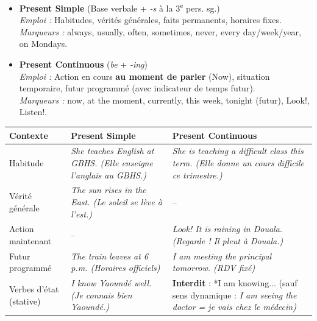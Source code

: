 \documentclass[11pt]{article}
\newcommand{\cle}[1]{{\popxbold\color{popdark}#1}}
\newcommand{\eng}[1]{\ifmmode\text{\textit{#1}}\else\begingroup\selectlanguage{english}\itshape #1\endgroup\fi}
\begin{document}
\begin{propriete}
\begin{itemize}
    \item \textbf{Present Simple} (Base verbale + \textit{-s} à la 3\textsuperscript{e} pers. sg.) \\
    \emph{Emploi :} Habitudes, vérités générales, faits permanents, horaires fixes. \\
    \emph{Marqueurs :} \cle{always}, \cle{usually}, \cle{often}, \cle{sometimes}, \cle{never}, \cle{every day/week/year}, \cle{on Mondays}.
    \item \textbf{Present Continuous} (\textit{be} + \textit{-ing}) \\
    \emph{Emploi :} Action en cours \textbf{au moment de parler} (Now), situation temporaire, futur programmé (avec indicateur de temps futur). \\
    \emph{Marqueurs :} \cle{now}, \cle{at the moment}, \cle{currently}, \cle{this week}, \cle{tonight} (futur), \cle{Look!}, \cle{Listen!}.
\end{itemize}
\end{propriete}

\begin{center}
\begin{tabularx}{\linewidth}{|X|X|X|}
\hline
\rowcolor{popblueL} \textbf{Contexte} & \textbf{Present Simple} & \textbf{Present Continuous} \\
\hline
Habitude & \eng{She teaches English at GBHS.} (Elle enseigne l'anglais au GBHS.) & \eng{She is teaching a difficult class this term.} (Elle donne un cours difficile ce trimestre.) \\
\hline
Vérité générale & \eng{The sun rises in the East.} (Le soleil se lève à l'est.) & -- \\
\hline
Action maintenant & -- & \eng{Look! It is raining in Douala.} (Regarde ! Il pleut à Douala.) \\
\hline
Futur programmé & \eng{The train leaves at 6 p.m.} (Horaires officiels) & \eng{I am meeting the principal tomorrow.} (RDV fixé) \\
\hline
Verbes d'état (stative) & \eng{I know Yaoundé well.} (Je connais bien Yaoundé.) & \textbf{Interdit} : *I am knowing... (sauf sens dynamique : \eng{I am seeing the doctor} = je vais chez le médecin) \\
\hline
\end{tabularx}
\end{center}
\end{document}
